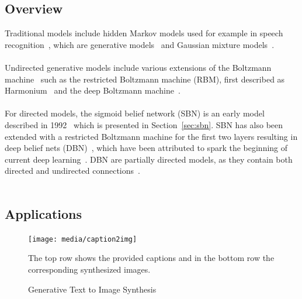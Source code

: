 


\subsection{Overview}
Traditional models include hidden Markov models used for example in speech recognition~\cite{hmm:1989}, which are generative models~\cite[p.~878]{modern_approach:2009} and Gaussian mixture models~\cite[p.~190]{deeplearning:2016}\cite{schuster:1999}.\\\\
%
Undirected generative models include various extensions of the Boltzmann machine~\cite{bm:1985} such as the restricted Boltzmann machine (RBM), first described as Harmonium~\cite{smolensky:1986} and the deep Boltzmann machine~\cite{dbm:2009}\cite[Chapter~20.4]{deeplearning:2016}.\\\\
%
For directed models, the sigmoid belief network (SBN) is an early model described in 1992~\cite{neal:1992} which is presented in Section~\ref{sec:sbn}.
SBN has also been extended with a restricted Boltzmann machine for the first two layers resulting in deep belief nets (DBN)~\cite{learning_dbn:2006}, which have been attributed to spark the beginning of current deep learning~\cite[p.~662]{deeplearning:2016}. DBN are partially directed models, as they contain both directed and undirected connections~\cite[p.~664]{deeplearning:2016}.\\\\
%

\subsection{Applications}


\begin{figure}[t]
  \texttt{[image: media/caption2img]}
  \caption[Caption-to-Image Samples]{Generative Text to Image Synthesis~\cite{gan_t2i:2016}}
  \medskip
  \small
  The top row shows the provided captions and in the bottom row the corresponding synthesized images.
\label{fig:caption2img}
\end{figure}


